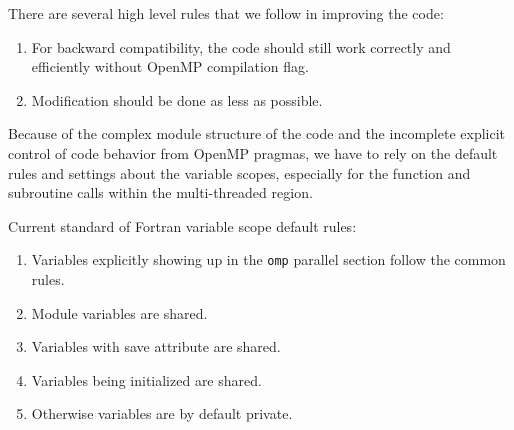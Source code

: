 \documentclass[fleqn,11pt]{SelfArx} %
\begin{document}
There are several high level rules that we follow in improving the code:
\begin{enumerate}
\item For backward compatibility, the code should still work correctly and efficiently without OpenMP compilation flag.
\item Modification should be done as less as possible.
\end{enumerate}

Because of the complex module structure of the code and the incomplete explicit control of code behavior from OpenMP pragmas, we have to rely on the default rules and settings about the variable scopes, especially for the function and subroutine calls within the multi-threaded region.

Current standard of Fortran variable scope default rules:
\begin{enumerate}
\item Variables explicitly showing up in the \verb|omp| parallel section follow the common rules.
\item Module variables are shared.
\item Variables with save attribute are shared.
\item Variables being initialized are shared.
\item Otherwise variables are by default private.
\end{enumerate}
\end{document}

